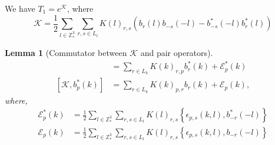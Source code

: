 \documentclass[sn-mathphys,Numbered]{sn-jnl}%
\theoremstyle{plain}
\newtheorem{lemma}[theorem]{Lemma}
\theoremstyle{definition}
\theoremstyle{remark}
\theoremstyle{plain}
\theoremstyle{definition}
\theoremstyle{remark}
\begin{document}
We have $T_1 = e^{\mathcal{K}}$, where 
\begin{equation}
\mathcal{K} = \frac{1}{2}\sum\limits_{l\in \mathbb{Z}^3_*}\sum\limits_{r,s\in L_l}K(l)_{r,s}\left(b_r(l)b_{-s}(-l)-b^*_{-s}(-l)b^*_{r}(l)\right)
\end{equation}
\begin{lemma}[Commutator between $\mathcal{K} $ and pair operators]
\begin{align}
    [\mathcal{K}, b_p(k)] &=\sum\limits_{r\in L_{k}}K(k)_{r,p}b^*_{r}(k) + \mathcal{E}^*_{p}(k)\label{eq:13} \\
    [\mathcal{K}, b^*_p(k)] &=\sum\limits_{r\in L_{k}}K(k)_{p,r}b_{r}(k) + \mathcal{E}_{p}(k)\label{eq:14},
\end{align}
    where, 
\begin{align}
    \mathcal{E}^*_{p}(k) &= \frac{1}{2}\sum\limits_{l\in \mathbb{Z}^3_*}\sum\limits_{r,s\in L_l}K(l)_{r,s}\left\{\epsilon_{p,s}(k,l),b^*_{-r}(-l)\right\}\\
    \mathcal{E}_{p}(k) &= \frac{1}{2}\sum\limits_{l\in \mathbb{Z}^3_*}\sum\limits_{r,s\in L_l}K(l)_{r,s}\left\{\epsilon_{p,s}(k,l),b_{-r}(-l)\right\} 
\end{align}
\end{lemma}
\end{document}
